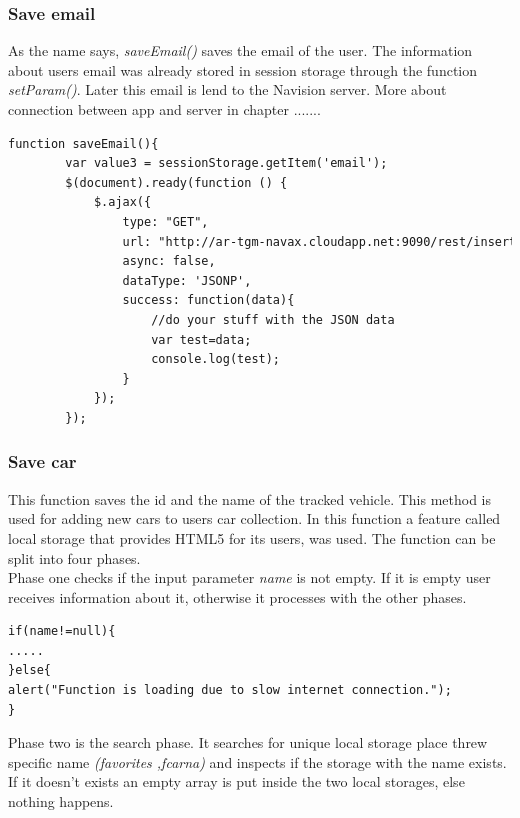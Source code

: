 \subsubsection{Save email}
As the name says, \textit{saveEmail()} saves the email of the user. The information about users email was already stored in session storage through the function \textit{setParam()}. Later this email is lend to the Navision server. More about connection between app and server in chapter .......
\\

\begin{lstlisting}[language=html, caption= 
Save email function,captionpos=b]
function saveEmail(){    
        var value3 = sessionStorage.getItem('email');
        $(document).ready(function () {
            $.ajax({
                type: "GET",
                url: "http://ar-tgm-navax.cloudapp.net:9090/rest/insertAndroidEmail/"+value3+"/ac73f229f1fb88a8719e5f6d295bee45?callback=?",
                async: false,
                dataType: 'JSONP',
                success: function(data){
                    //do your stuff with the JSON data
                    var test=data;
                    console.log(test);
                }
            });
        });
\end{lstlisting}

\subsubsection{Save car}
This function saves the id and the name of the tracked vehicle. This method is used for adding new cars to users car collection. In this function a feature called local storage that provides HTML5 for its users, was used. The function can be split into four phases.
\\

Phase one checks if the input parameter \textit{name} is not empty. If it is empty user receives information about it, otherwise it processes with the other phases.

\begin{lstlisting}[language=html, caption= 
Phase one,captionpos=b]
if(name!=null){
.....
}else{
alert("Function is loading due to slow internet connection.");
}
\end{lstlisting}

Phase two is the search phase. It searches for unique local storage place threw specific name \textit{(favorites ,fcarna)} and inspects if the storage with the name exists. If it doesn't exists an empty array is put inside the two local storages, else nothing happens.
\\

